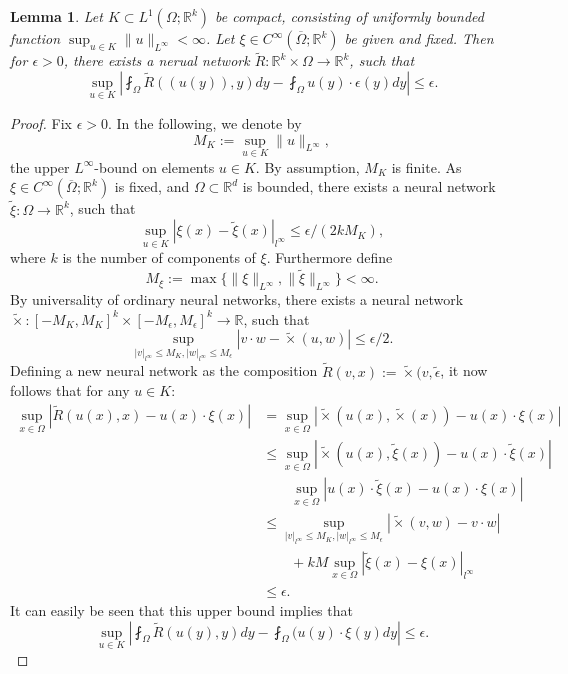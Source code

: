 \documentclass[reqno]{amsart}
\theoremstyle{plain}
\newtheorem{lem}{Lemma}
\theoremstyle{definition}
\newcommand{\bb}[1]{\mathbb{#1}}
\begin{document}
\begin{lem}\label{lem7}
    Let $K \subset L^1(\Omega; \bb R^k)$ be compact, consisting of uniformly bounded function $\sup_{u \in K} \|u\|_{L^\infty} < \infty$. Let $\xi \in C^\infty(\overline{\Omega};\bb R^k)$ be given and fixed. Then for $\epsilon>0$, there exists a nerual network $\tilde{R} : \bb R^k \times \Omega \to \bb R^k$, such that 
    $$ \sup_{u \in K}\left|\fint_\Omega \tilde{R}((u(y)),y) dy - \fint_\Omega u(y) \cdot \epsilon(y) dy \right| \leq \epsilon.$$
\end{lem}
\begin{proof}
    Fix $\epsilon > 0$. In the following, we denote by
    $$ M_K := \sup_{u\in K}\|u\|_{L^\infty},$$
    the upper $L^\infty$-bound on elements $u \in K$. By assumption, $M_K$ is finite. As $\xi \in C^\infty(\overline{\Omega};\bb R^k)$ is fixed, and $\Omega \subset \bb R^d$ is bounded, there exists a neural network $\tilde{\xi}: \Omega \to \bb R^k$, such that 
    $$ \sup_{u \in K}|\xi(x) - \tilde{\xi}(x)|_{l^\infty} \leq \epsilon/(2kM_K),$$
    where $k$ is the number of components of $\xi$. Furthermore define
    $$ M_{\xi} := \max\{\|\xi\|_{L^\infty}, \|\tilde{\xi}\|_{L^\infty}\} < \infty.$$
    By universality of ordinary neural networks, there exists a neural network $\tilde{\times} : [-M_K,M_K]^k \times [-M_\epsilon,M_\epsilon]^k \to \bb R$, such that
    $$ \sup_{|v|_{l^\infty}\leq M_K,|w|_{l^\infty}\leq M_\epsilon} |v\cdot w - \tilde{\times}(u,w)| \leq \epsilon/2.$$
    Defining a new neural network as the composition $\tilde{R}(v,x):= \tilde{\times}(v,\tilde{\epsilon}$, it now follows that for any $u \in K$: 
    $$
    \begin{aligned}
        \sup_{x\in \Omega}|\tilde{R}(u(x),x) - u(x)\cdot\xi(x)| &= \sup_{x\in \Omega} |\tilde{\times}(u(x),\tilde{\times}(x)) - u(x) \cdot \xi(x)| \\
        &\leq \sup_{x\in \Omega}|\tilde{\times}(u(x), \tilde{\xi}(x)) - u(x)\cdot \tilde{\xi}(x)| \\
        &\qquad \sup_{x\in \Omega}|u(x) \cdot \tilde{\xi}(x) - u(x) \cdot \xi(x)|\\
        &\leq \sup_{|v|_{l^\infty}\leq M_K,|w|_{l^\infty}\leq M_\epsilon} |\tilde{\times}(v,w) - v \cdot w| \\
        &\qquad +kM \sup_{x \in \Omega}|\tilde{\xi}(x) - \xi(x)|_{l^\infty} \\
        &\leq \epsilon.
    \end{aligned}
    $$
    It can easily be seen that this upper bound implies that
    $$ \sup_{u \in K}\left|\fint_{\Omega}\tilde{R}(u(y),y) dy - \fint_{\Omega}(u(y)\cdot \xi(y) dy \right| \leq \epsilon.$$
\end{proof}
\end{document}
